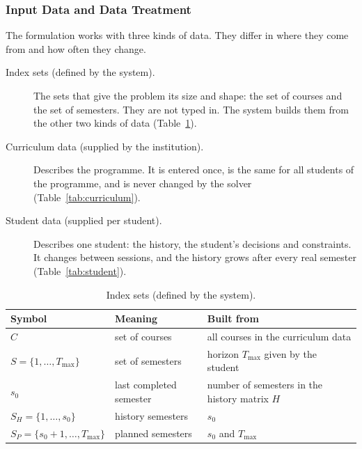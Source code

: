 \documentclass[10pt,a4paper]{article}
\begin{document}
      \subsubsection{Input Data and Data Treatment}\label{sec:inputs}

The formulation works with three kinds of data. They differ in where they come from and how often they change.
\begin{description}
  \item[Index sets (defined by the system).] The sets that give the problem its size and shape: the set of courses and the set of semesters. They are not typed in. The system builds them from the other two kinds of data (Table~\ref{tab:index}).
  \item[Curriculum data (supplied by the institution).] Describes the programme. It is entered once, is the same for all students of the programme, and is never changed by the solver (Table~\ref{tab:curriculum}).
  \item[Student data (supplied per student).] Describes one student: the history, the student's decisions and constraints. It changes between sessions, and the history grows after every real semester (Table~\ref{tab:student}).
\end{description}

\begin{table}[ht]
\centering
\small
\begin{tabular}{@{}>{\raggedright\arraybackslash}p{3.9cm}>{\raggedright\arraybackslash}p{4.2cm}>{\raggedright\arraybackslash}p{5.2cm}@{}}
\toprule
\textbf{Symbol} & \textbf{Meaning} & \textbf{Built from} \\
\midrule
$C$ & set of courses & all courses in the curriculum data \\
$S=\{1,\dots,T_{\max}\}$ & set of semesters & horizon $T_{\max}$ given by the student \\
$s_0$ & last completed semester & number of semesters in the history matrix $H$ \\
$S_H=\{1,\dots,s_0\}$ & history semesters & $s_0$ \\
$S_P=\{s_0+1,\dots,T_{\max}\}$ & planned semesters & $s_0$ and $T_{\max}$ \\
\bottomrule
\end{tabular}
\caption{Index sets (defined by the system).}
\label{tab:index}
\end{table}
\end{document}
